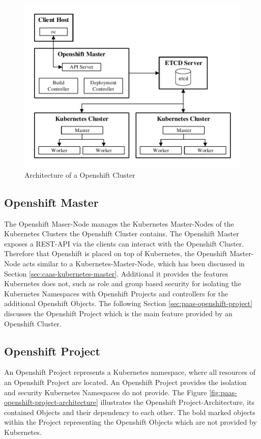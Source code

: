 \newpage

\begin{figure}[htbp]
	\centering
	\includegraphics[scale=1]{images/openshift-kubernetes-cluster-architecture.pdf}
	\caption{Architecture of a Openshift Cluster}
	\label{fig:paas-openshift-kubernetes-cluster-architecture}
\end{figure} 

\subsection{Openshift Master}
\label{sec:paas-openshift-master}
The Openshift Maser-Node manages the Kubernetes Master-Nodes of the Kubernetes Clusters the Openshift Cluster contains. The Openshift Master exposes a REST-API via the clients can interact with the Openshift Cluster. Therefore that Openshift is placed on top of Kubernetes, the Openshift Master-Node acts similar to a Kubernetes-Master-Node, which has been discussed in Section \vref{sec:caas-kubernetes-master}. Additional it provides the features Kubernetes does not, such as role and group based security for isolating the Kubernetes Namespaces with Openshift Projects and controllers for the additional Openshift Objects. The following Section \vref{sec:paas-openshift-project} discusses the Openshift Project which is the main feature provided by an Openshift Cluster.

\subsection{Openshift Project}
\label{sec:paas-openshift-project}
An Openshift Project represents a Kubernetes namespace, where all resources of an Openshift Project are located. An Openshift Project provides the isolation and security Kubernetes Namespaces do not provide. The Figure \vref{fig:paas-openshift-project-architecture} illustrates the Openshift Project-Architecture, its contained Objects and their dependency to each other. The bold marked objects within the Project representing the Openshift Objects which are not provided by Kubernetes.

